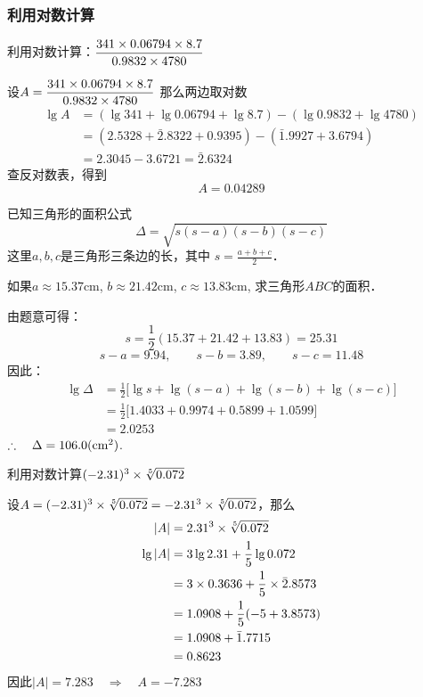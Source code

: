 \subsubsection{利用对数计算}

\begin{example}
    利用对数计算：$\dfrac{341\times 0.06794\times 8.7}{0.9832\times 4780}$
\end{example}

\begin{solution}
设$A=\dfrac{341\times 0.06794\times 8.7}{0.9832\times 4780}$
那么两边取对数
\[\begin{split}
    \lg A&=(\lg 341+\lg0.06794+\lg8.7)-(\lg0.9832+\lg4780)\\
&=(2.5328+\bar{2}.8322+0.9395)-(\bar{1}.9927+3.6794)\\
&=2.3045-3.6721=\bar{2}.6324
\end{split}\]
查反对数表，得到
\[A=0.04289\]    
\end{solution}    


\begin{example}
    已知三角形的面积公式
    \[\Delta=\sqrt{s(s-a)(s-b)(s-c)}\]
    这里$a,b,c$是三角形三条边的长，其中
    $s=\frac{a+b+c}{2}$．

    如果$a\approx 15.37$cm, $b\approx 21.42$cm, $c\approx13.83$cm,
    求三角形$ABC$的面积．
\end{example}

\begin{solution}
由题意可得：
\[s=\frac{1}{2}(15.37+21.42+13.83)=25.31\]
\[s-a=9.94,\qquad s-b=3.89,\qquad s-c=11.48\]
因此：
\[\begin{split}
    \lg \Delta&=\frac{1}{2}\bigl[\lg s+\lg(s-a)+\lg(s-b)+\lg(s-c)\bigr]\\
&=\frac{1}{2}\bigl[1.4033+0.9974+0.5899+1.0599\bigr]\\
&=2.0253
\end{split}\]
$\therefore\quad \Delta=106.0({\rm cm}^2)$.
\end{solution}    

\begin{example}
    利用对数计算$(-2.31)^3\times\sqrt[5]{0.072}$
\end{example}

\begin{solution}
    设$A=(-2.31)^3\times\sqrt[5]{0.072}=-2.31^3\times\sqrt[5]{0.072}$，那么
\[\begin{split}
    |A|&=2.31^3\times \sqrt[5]{0.072}\\
\lg|A|&=3\lg 2.31+\dfrac{1}{5}\lg 0.072\\
&=3\times 0.3636+\dfrac{1}{5}\times \bar{2}.8573\\
&=1.0908+\dfrac{1}{5}(-5+3.8573)\\
&=1.0908+\bar{1}.7715\\
&=0.8623
\end{split}\]
因此$|A|=7.283 \quad \Rightarrow\quad A=-7.283$
\end{solution}    


